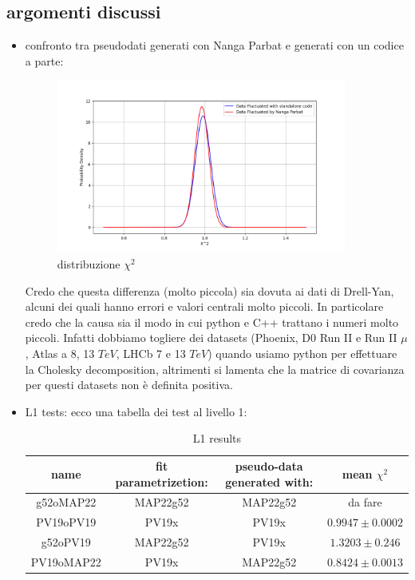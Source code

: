 \documentclass{article}
\begin{document}
\subsection{argomenti discussi}
\begin{itemize}
    \item confronto tra pseudodati generati con Nanga Parbat e generati con un codice a parte:
    \begin{figure}[H]
        \centering
        \includegraphics[width=0.9\textwidth]{Images/X2_distribution.png}
        \caption{distribuzione $\chi^2$ }
        \label{fig:enter-label}
    \end{figure}

    Credo che questa differenza (molto piccola) sia dovuta ai dati di Drell-Yan, alcuni dei quali hanno errori e valori centrali molto piccoli. In particolare credo che la causa sia il modo in cui python e C++ trattano i numeri molto piccoli. Infatti dobbiamo togliere dei datasets (Phoenix, D0 Run II e Run II $\mu$, Atlas a 8, 13 $TeV$, LHCb 7 e 13 $TeV$) quando usiamo python per effettuare la Cholesky decomposition, altrimenti si lamenta che la matrice di covarianza per questi datasets non è definita positiva.

    \item L1 tests: 
    ecco una tabella dei test al livello 1:
    \begin{table}[h]
    \caption{L1 results}
    \label{tab:L0_results}
    \centering
    \begin{adjustbox}{width=\textwidth}
        \begin{tabular}{|c|c|c|c|}
        \hline
        \textbf{name} & \textbf{fit parametrizetion:} & \textbf{pseudo-data  generated with:} & \textbf{mean $\chi^2$}\\
        \hline
        g52oMAP22 & MAP22g52 & MAP22g52 & da fare  \\
        PV19oPV19 & PV19x & PV19x & $0.9947 \pm 0.0002$  \\
        g52oPV19 & MAP22g52 &  PV19x & $1.3203 \pm 0.246$ \\
        PV19oMAP22 & PV19x & MAP22g52 &  $0.8424 \pm 0.0013$ \\
        \hline
    \end{tabular}
\end{adjustbox}
\end{table}
\end{itemize}
\end{document}
